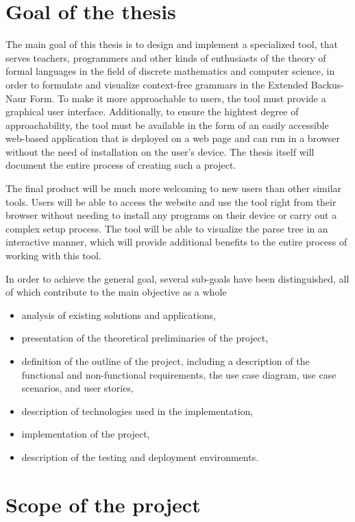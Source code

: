 \documentclass[english,bachelors,forcepolishlogotype]{wizthesis}
\begin{document}
\section{Goal of the thesis}

The main goal of this thesis is to design and implement a specialized tool, that
serves teachers, programmers and other kinds of enthusiasts of the theory of
formal languages in the field of discrete mathematics and computer science, in
order to formulate and visualize context-free grammars in the Extended
Backus-Naur Form. To make it more approachable to users, the tool must provide a
graphical user interface. Additionally, to ensure the hightest degree of
approachability, the tool must be available in the form of an easily accessible
web-based application that is deployed on a web page and can run in a browser
without the need of installation on the user's device. The thesis itself will
document the entire process of creating such a project.

The final product will be much more welcoming to new users than other similar
tools. Users will be able to access the website and use the tool right from
their browser without needing to install any programs on their device or carry
out a complex setup process. The tool will be able to visualize the parse tree
in an interactive manner, which will provide additional benefits to the entire
process of working with this tool.

In order to achieve the general goal, several sub-goals have been
distinguished, all of which contribute to the main objective as a whole
\begin{itemize}
  \item analysis of existing solutions and applications,
  \item presentation of the theoretical preliminaries of the project,
  \item definition of the outline of the project, including a description of the
  functional and non-functional requirements, the use case diagram, use case
  scenarios, and user stories,
  \item description of technologies used in the implementation,
  \item implementation of the project,
  \item description of the testing and deployment environments.
\end{itemize}

\section{Scope of the project}
\end{document}
